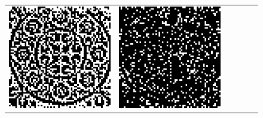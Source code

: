 \begin{figure}
\begin{tabular}{c c c c c c}
		\includegraphics[width=\tilewidth,interpolate=false]{media/chp2/associative_memory/binam/02_00_orig_scaled_crushed.png}&%
		\includegraphics[width=\tilewidth,interpolate=false]{media/chp2/associative_memory/binam/02_01_noise_scaled_crushed.png}&%

\end{tabular}
\end{figure}
